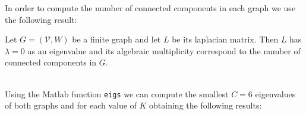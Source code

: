 In order to compute the number of connected components in each graph we use the following result:
\begin{thm}
    Let \(G = (\mathcal{V}, W)\) be a finite graph and let \(L\) be its laplacian matrix. Then \(L\) has \(\lambda = 0\) as an eigenvalue and its algebraic multiplicity correspond to the number of connected components in \(G\).
\end{thm}
\\
Using the Matlab function \texttt{eigs} we can compute the smallest \(C = 6\) eigenvalues of both graphs and for each value of \(K\) obtaining the following results: